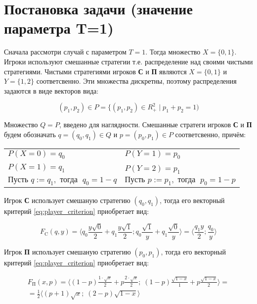 \section{Постановка задачи (значение параметра T=1)}

Сначала рассмотри случай с параметром $T=1$. Тогда множество $X=\{0, 1\}$.
Игроки используют смешанные стратегии т.е. распределение над своими чистыми стратегиями.
Чистыми стратегиями игроков \textbf{С} и \textbf{П} являются $X=\{0, 1\}$ и $Y=\{1,2\}$ 
соответсвенно. Эти множества дискретны, поэтому распределения задаются в виде векторов 
вида: 

$$(p_1, p_2) \in P = \{(p_1, p_2) \in R_+^2 \; | \; p_1 + p_2 = 1)$$

Множество $Q=P$, введено для наглядности. 
Смешанные стратеги игроков \textbf{С} и \textbf{П} будем обозначать
$q=(q_0,q_1) \in Q$ и $p=(p_0,p_1) \in P$ соответсвенно, причём:

\begin{center}
\begin{tabu} to 0.9 \textwidth {X[c] X[c]}
	$P(X=0)=q_0$ & $P(Y=1)=p_0$ \\
	$P(X=1)=q_1$ & $P(Y=2)=p_1$ \
	\\
	$\textrm{Пусть  } q := q_1, \textrm{ тогда }\; q_0=1-q$ & 
	$\textrm{Пусть  } p := p_1, \textrm{ тогда }\; p_0=1-p$ 
\end{tabu}	
\end{center}

Игрок \textbf{С} использует смешаную стратегию  $(q_0,q_1)$, тогда
его векторный критерий \eqref{eq:player_criterion} приобретает вид: 

$$
	F_\textrm{C}(q,y)=
	\big \langle
		q_0\frac{y\sqrt{0}}{2} + 
		q_1\frac{y\sqrt{1}}{2};
		q_0\frac{\sqrt{1}}{y} +
		q_1\frac{\sqrt{0}}{y}
	\big \rangle 
	= 	
	\big \langle
		\frac{q_1y}{2};
		\frac{q_0}{y}
	\big \rangle 
$$

Игрок \textbf{П} использует смешаную стратегию  $(p_0,p_1)$, тогда
его векторный критерий \eqref{eq:player_criterion} приобретает вид: 

\begin{gather*}
	F_\textrm{П}(x,p)=
	\big \langle 
		(1-p)\frac{1 \cdot \sqrt{x}}{2} + p \frac{2 \cdot \sqrt{x}}{2}; \;
		(1-p)\frac{\sqrt{1-x}}{1}+p\frac{\sqrt{1-x}}{2} 
	\big \rangle=
	\\
	=\frac{1}{2}
	\big \langle
		(p+1)\sqrt{x}; \;
		(2-p)\sqrt{1-x}
	\big \rangle
\end{gather*}
	
\vspace{5mm}

